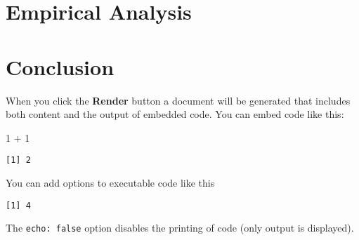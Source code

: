 \documentclass[
  letterpaper,
  DIV=11,
  numbers=noendperiod]{scrartcl}
\newenvironment{Shaded}{\begin{snugshade}}{\end{snugshade}}
\newcommand{\DecValTok}[1]{\textcolor[rgb]{0.68,0.00,0.00}{#1}}
\newcommand{\SpecialCharTok}[1]{\textcolor[rgb]{0.37,0.37,0.37}{#1}}
\begin{document}
\section{Empirical Analysis}\label{empirical-analysis}

\section{Conclusion}\label{conclusion}

When you click the \textbf{Render} button a document will be generated
that includes both content and the output of embedded code. You can
embed code like this:

\begin{Shaded}
\begin{Highlighting}[]
\DecValTok{1} \SpecialCharTok{+} \DecValTok{1}
\end{Highlighting}
\end{Shaded}

\begin{verbatim}
[1] 2
\end{verbatim}

You can add options to executable code like this

\begin{verbatim}
[1] 4
\end{verbatim}

The \texttt{echo:\ false} option disables the printing of code (only
output is displayed).
\end{document}
